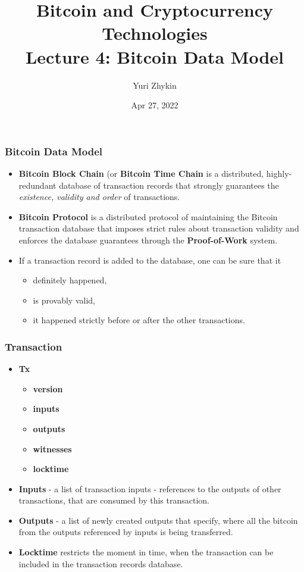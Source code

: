 \documentclass{beamer}
\title{
  Bitcoin and Cryptocurrency Technologies \\
  Lecture 4: Bitcoin Data Model
}
\author{Yuri Zhykin}
\date{Apr 27, 2022}
\begin{document}
\frame{\titlepage}

\begin{frame}
  \frametitle{Bitcoin Data Model}
  \begin{itemize}
  \item \textbf{Bitcoin Block Chain} (or \textbf{Bitcoin Time Chain} is a
    distributed, highly-redundant database of transaction records that strongly
    guarantees the \textit{existence, validity and order} of transactions.
  \item \textbf{Bitcoin Protocol} is a distributed protocol of maintaining the
    Bitcoin transaction database that imposes strict rules about transaction
    validity and enforces the database guarantees through the
    \textbf{Proof-of-Work} system.
  \item If a transaction record is added to the database, one can be sure that
    it 
    \begin{itemize}
    \item definitely happened,
    \item is provably valid,
    \item it happened strictly before or after the other transactions.
    \end{itemize}
  \end{itemize}
\end{frame}

\begin{frame}
  \frametitle{Transaction}
  \begin{itemize}
  \item \textbf{Tx}
    \begin{itemize}
    \item \textbf{version}
    \item \textbf{inputs}
    \item \textbf{outputs}
    \item \textbf{witnesses}
    \item \textbf{locktime}
    \end{itemize}
  \item \textbf{Inputs} - a list of transaction inputs - references to the
    outputs of other transactions, that are consumed by this transaction.
  \item \textbf{Outputs} - a list of newly created outputs that specify, where
    all the bitcoin from the outputs referenced by inputs is being transferred.
  \item \textbf{Locktime} restricts the moment in time, when the transaction can
    be included in the transaction records database.
  \end{itemize}
\end{frame}
\end{document}
